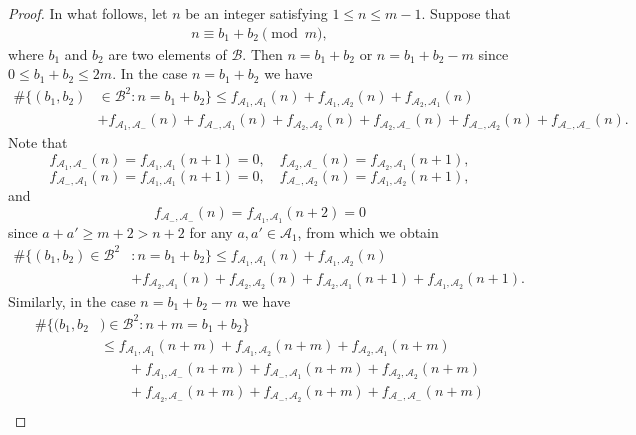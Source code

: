 \documentclass[12pt,a4paper,reqno]{amsart}
\numberwithin{equation}{section}
\theoremstyle{plain}
\theoremstyle{definition}
\begin{document}
\begin{proof}
In what follows, let $n$ be an integer satisfying $1\le n\le m-1$. Suppose that
\begin{align*}
    n\equiv b_1+b_2\pmod{m},
\end{align*}
where $b_1$ and $b_2$ are two elements of $\mathcal{B}$.
Then $n=b_1+b_2$ or $n=b_1+b_2-m$ since $0\le b_1+b_2\le 2m$. In the case $n=b_1+b_2$ we have
\begin{align*}
    \#\big\{(b_1, b_2)&\in \mathcal{B}^2 :  n=b_1 +b_2\big\}
    \le f_{\mathcal{A}_{1},\mathcal{A}_{1}}(n)+f_{\mathcal{A}_{1},\mathcal{A}_{2}}(n)+f_{\mathcal{A}_{2},\mathcal{A}_{1}}(n)\\
&+f_{\mathcal{A}_{1},\mathcal{A}_{-}}(n)+f_{\mathcal{A}_{-},\mathcal{A}_{1}}(n)+f_{\mathcal{A}_{2},\mathcal{A}_{2}}(n)+f_{\mathcal{A}_{2},\mathcal{A}_{-}}(n)+f_{\mathcal{A}_{-},\mathcal{A}_{2}}(n)+f_{\mathcal{A}_{-},\mathcal{A}_{-}}(n).
\end{align*}
Note that
$$
f_{\mathcal{A}_{1},\mathcal{A}_{-}}(n)=f_{\mathcal{A}_{1},\mathcal{A}_{1}}(n+1)=0,\quad f_{\mathcal{A}_{2},\mathcal{A}_{-}}(n)=f_{\mathcal{A}_{2},\mathcal{A}_{1}}(n+1),
$$
$$
f_{\mathcal{A}_{-},\mathcal{A}_{1}}(n)=f_{\mathcal{A}_{1},\mathcal{A}_{1}}(n+1)=0,\quad f_{\mathcal{A}_{-},\mathcal{A}_{2}}(n)=f_{\mathcal{A}_{1},\mathcal{A}_{2}}(n+1),
$$
and
$$
f_{\mathcal{A}_{-},\mathcal{A}_{-}}(n)=f_{\mathcal{A}_{1},\mathcal{A}_{1}}(n+2)=0
$$
since $a+a'\ge m+2>n+2$ for any $a, a'\in \mathcal{A}_{1}$,
from which we obtain
\begin{align}\label{eq-proof-4}
    \#\big\{(b_1, b_2)\in \mathcal{B}^2& :  n=b_1 +b_2\big\}
    \le f_{\mathcal{A}_{1},\mathcal{A}_{1}}(n)+f_{\mathcal{A}_{1},\mathcal{A}_{2}}(n)\nonumber\\
    &+f_{\mathcal{A}_{2},\mathcal{A}_{1}}(n)+f_{\mathcal{A}_{2},\mathcal{A}_{2}}(n)+f_{\mathcal{A}_{2},\mathcal{A}_{1}}
    (n+1)+f_{\mathcal{A}_{1},\mathcal{A}_{2}}
    (n+1).
\end{align}
Similarly, in the case $n=b_1+b_2-m$ we have
\begin{align}\label{eq-proof-5}
    \#\big\{(b_1,b_2&)\in \mathcal{B}^2: n +m= b_1+b_2\big\}\nonumber\\
    &\le f_{\mathcal{A}_{1},\mathcal{A}_{1}}(n+m)+f_{\mathcal{A}_{1},\mathcal{A}_{2}}(n+m)
    +f_{\mathcal{A}_{2},\mathcal{A}_{1}}(n+m)\nonumber\\
    &\quad \quad +f_{\mathcal{A}_{1},\mathcal{A}_{-}}(n+m)+f_{\mathcal{A}_{-},\mathcal{A}_{1}}(n+m)+f_{\mathcal{A}_{2},\mathcal{A}_{2}}(n+m)\nonumber\\
    &\quad \quad +f_{\mathcal{A}_{2},\mathcal{A}_{-}}(n+m)+f_{\mathcal{A}_{-},\mathcal{A}_{2}}(n+m)+f_{\mathcal{A}_{-},\mathcal{A}_{-}}(n+m)\nonumber\\

\end{align}
\end{proof}
\end{document}
